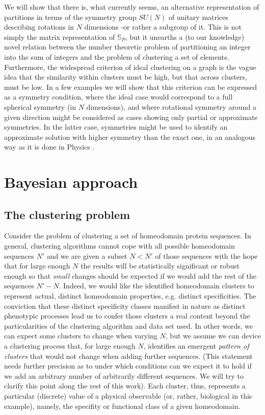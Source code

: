 \documentclass[twocolumn,aps,sort,nofootinbib]{revtex4}
\begin{document}
We will show that there is, what currently seems, an
alternative representation of partitions in terms of the
symmetry group $SU(N)$ of unitary matrices describing
rotations in $N$ dimensions -or rather a subgroup of it.
This is not simply the matrix representation of $\mathbb{S}_P$,
but it unearths a (to our knowledge) novel relation between
the number theoretic problem of partitioning an integer  into
the sum of integers and the problem of clustering a set of elements.  
Furthermore, the widespread criterion of ideal clustering on a graph 
is the vague idea that the similarity within clusters
must be high, but that across clusters, must be low.
In a few examples we will show that this criterion
can be expressed as a symmetry condition, where
the ideal case would correspond to a full spherical
symmetry (in $N$ dimensions), and where rotational
symmetry around a given direction might be
considered as cases showing only partial or 
approximate symmetries. In the latter case,
symmetries might be used to identify an approximate
solution with higher symmetry than the exact one, 
in an analogous way as it is done in Physics \cite{Lipkin65}.

\section{Bayesian approach}\label{BayesianApproach}
\subsection{The clustering problem}\label{TheClusteringProblem}
Consider the problem of clustering a set of homeodomain protein sequences.
In general, clustering algorithms cannot cope with all possible homeodomain sequences $N'$
and we are given a subset $N<N'$ of those sequences with the hope that for large
enough $N$ the results will be statistically significant or robust enough so that
{\sl small} changes should be expected if we would add the rest of the sequences $N'-N$.
Indeed, we would like the identified homeodomain clusters to represent actual, distinct homeodomain
properties, e.g. distinct specificities. The conviction that these distinct specificity
classes manifest in nature as distinct phenotypic processes lead us to confer those
clusters a real content beyond the particularities of 
the clustering algorithm and data set used.
In other words, we can expect some clusters to change when varying $N$, but we assume we can device 
a clustering process that, for large enough $N$, identifies 
an emergent {\sl pattern of clusters} that would not change when adding further sequences.
(This statement needs further precision as to under which conditions can
we expect it to hold if we add an arbitrary number of arbitrarily different
sequences. We will try to clarify this point along the rest of this work).
Each cluster, thus, represents a particular (discrete) value of a physical 
observable (or, rather, biological in this example), namely, the specifity
or functional class of a given homeodomain.
\end{document}
